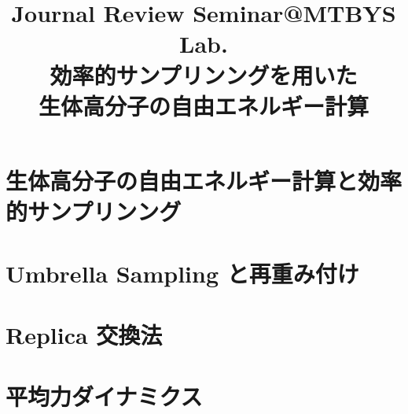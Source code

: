 \documentclass[11pt,a4papaer]{jsarticle}
\begin{document}
\date{}

\title  { {\small Journal Review Seminar@MTBYS Lab.} \\
  効率的サンプリンングを用いた \\
  生体高分子の自由エネルギー計算}
 

\maketitle
\thispagestyle{empty}

\newpage

\tableofcontents

\thispagestyle{empty}

\newpage

\pagestyle{myheadings}

\setcounter{page}{1}

\section{生体高分子の自由エネルギー計算と効率的サンプリンング \label{sec_01intro}}
\setcounter{equation}{0}
\renewcommand{\theequation}{\arabic{section}-\arabic{equation}}


\newpage

\section{Umbrella Sampling と再重み付け \label{sec_02US}}
\setcounter{equation}{0}
\renewcommand{\theequation}{\arabic{section}-\arabic{equation}}


\newpage

\section{Replica 交換法 \label{sec_03RE}}
\setcounter{equation}{0}
\renewcommand{\theequation}{\arabic{section}-\arabic{equation}}


\newpage

\section{平均力ダイナミクス \label{sec_04MFD}}
\setcounter{equation}{0}
\renewcommand{\theequation}{\arabic{section}-\arabic{equation}}

\end{document}
